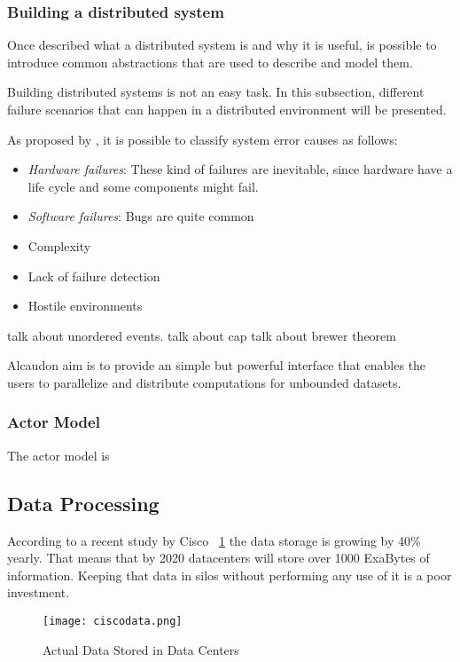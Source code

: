\subsubsection{Building a distributed system}

Once described what a distributed system is and why it is useful, is possible to
introduce common abstractions that are used to describe and model them. 

Building distributed systems is not an easy task. In this subsection, different
failure scenarios that can happen in a distributed environment will be presented.

As proposed by \cite{GuideReliable}, it is possible to classify system error
causes as follows:
\begin{itemize}
\item \textit{Hardware failures}: These kind of failures are inevitable, since
  hardware have a life cycle and some components might fail.
\item \textit{Software failures}: Bugs are quite common
\item Complexity
\item Lack of failure detection
\item Hostile environments
\end{itemize}

talk about unordered events.
talk about cap
talk about brewer theorem

Alcaudon aim is to provide an simple but powerful interface that enables the
users to parallelize and distribute computations for unbounded datasets.

\subsubsection{Actor Model}

The actor model is 

\subsection{Data Processing}

According to a recent study by Cisco \cite{ciscosurvey}~\ref{fig:ciscodata} the
data storage is growing by 40\% yearly. That means that by 2020 datacenters will
store over 1000 ExaBytes of information. Keeping that data in silos without
performing any use of it is a poor investment.

\begin{figure}[!h]
\begin{center}
\texttt{[image: ciscodata.png]}
\caption{Actual Data Stored in Data Centers\cite{ciscosurvey}}
\label{fig:ciscodata}
\end{center}
\end{figure}

